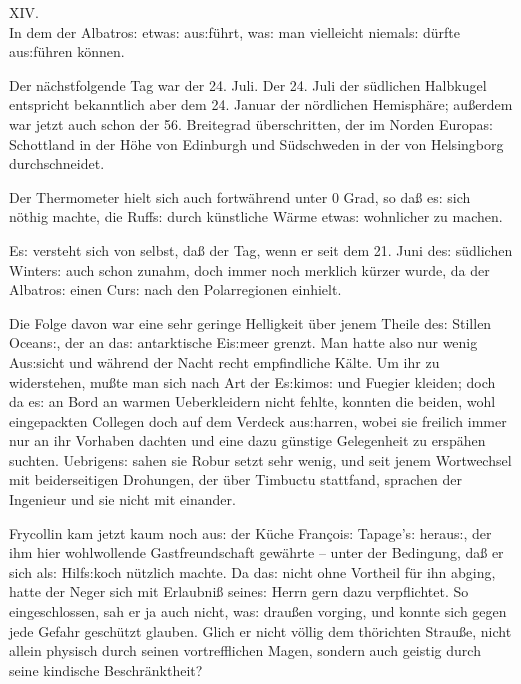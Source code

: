 \documentclass[oneside,12pt]{book}
\newenvironment{antiqua}{\normalfont}{}
\newcommand{\s}{s:}
\begin{document}
\newpage\begin{center}\label{kap14}
{\large \begin{antiqua}XIV.\end{antiqua}\\
In dem der {\glqq}Albatro{\s}{\grqq} etwa{\s} au{\s}f\"uhrt, wa{\s}
man vielleicht niemal{\s} d\"urfte au{\s}f\"uhren k\"onnen.\\\bigskip}
\end{center}



Der n\"achstfolgende Tag war der 24. Juli. Der 24. Juli der
s\"udlichen Halbkugel entspricht bekanntlich aber dem 24. Januar der
n\"ordlichen Hemisph\"are; au{\ss}erdem war jetzt auch schon der 56.
Breitegrad \"uberschritten, der im Norden Europa{\s} Schottland in
der H\"ohe von Edinburgh und S\"udschweden in der von Helsingborg
durchschneidet.

Der Thermometer hielt sich auch fortw\"ahrend unter 0 Grad, so
da{\ss} e{\s} sich n\"othig machte, die Ruff{\s} durch k\"unstliche
W\"arme etwa{\s} wohnlicher zu machen.

E{\s} versteht sich von selbst, da{\ss} der Tag, wenn er seit dem 21.
Juni de{\s} s\"udlichen Winter{\s} auch schon zunahm, doch immer noch
merklich k\"urzer wurde, da der {\glqq}Albatro{\s}{\grqq} einen
Cur{\s} nach den Polarregionen einhielt.

Die Folge davon war eine sehr geringe Helligkeit \"uber jenem Theile
de{\s} Stillen Ocean{\s}, der an da{\s} antarktische Ei{\s}meer
grenzt. Man hatte also nur wenig Au{\s}sicht und w\"ahrend der Nacht
recht empfindliche K\"alte. Um ihr zu widerstehen, mu{\ss}te man sich
nach Art der E{\s}kimo{\s} und Fuegier kleiden; doch da e{\s} an Bord
an warmen Ueberkleidern nicht fehlte, konnten die beiden, wohl
eingepackten Collegen doch auf dem Verdeck au{\s}harren, wobei sie
freilich immer nur an ihr Vorhaben dachten und eine dazu g\"unstige
Gelegenheit zu ersp\"ahen suchten. Uebrigen{\s} sahen sie Robur setzt
sehr wenig, und seit jenem Wortwechsel mit beiderseitigen Drohungen,
der \"uber Timbuctu stattfand, sprachen der Ingenieur und sie nicht
mit einander.

Frycollin kam jetzt kaum noch au{\s} der K\"uche Fran\c{c}oi{\s}
Tapage'{\s} herau{\s}, der ihm hier wohlwollende Gastfreundschaft
gew\"ahrte -- unter der Bedingung, da{\ss} er sich al{\s}
Hilf{\s}koch n\"utzlich machte. Da da{\s} nicht ohne Vortheil f\"ur
ihn abging, hatte der Neger sich mit Erlaubni{\ss} seine{\s} Herrn
gern dazu verpflichtet. So eingeschlossen, sah er ja auch nicht,
wa{\s} drau{\ss}en vorging, und konnte sich gegen jede Gefahr
gesch\"utzt glauben. Glich er nicht v\"ollig dem th\"orichten
Strau{\ss}e, nicht allein physisch durch seinen vortrefflichen Magen,
sondern auch geistig durch seine kindische Beschr\"anktheit?
\end{document}
